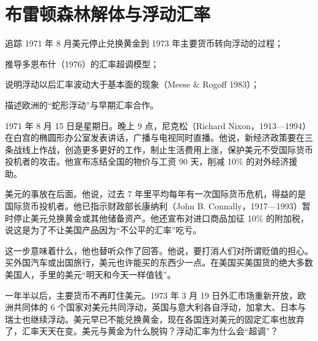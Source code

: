 \chapter{布雷顿森林解体与浮动汇率}\label{ch:floating}

\begin{chapterguide}
\begin{guidegoals}
\item 追踪 1971 年 8 月美元停止兑换黄金到 1973 年主要货币转向浮动的过程；
\item 推导多恩布什（1976）的汇率超调模型；
\item 说明浮动以后汇率波动大于基本面的现象（Meese \& Rogoff 1983）；
\item 描述欧洲的“蛇形浮动”与早期汇率合作。
\end{guidegoals}
\end{chapterguide}

1971 年 8 月 15 日是星期日。晚上 9 点，尼克松（Richard Nixon，1913—1994）在白宫的椭圆形办公室发表讲话，广播与电视同时直播\cite{nixon1971,loc46}。他说，新经济政策要在三条战线上作战，创造更多更好的工作，制止生活费用上涨，保护美元不受国际货币投机者的攻击\cite{nixon1971}。他宣布冻结全国的物价与工资 90 天，削减 10\% 的对外经济援助\cite{nixon1971}。

美元的事放在后面。他说，过去 7 年里平均每年有一次国际货币危机，得益的是国际货币投机者\cite{nixon1971}。他已指示财政部长康纳利（John B. Connally，1917—1993）暂时停止美元兑换黄金或其他储备资产\cite{nixon1971,loc46}。他还宣布对进口商品加征 10\% 的附加税，说这是为了不让美国产品因为“不公平的汇率”吃亏\cite{nixon1971}。

这一步意味着什么，他也替听众作了回答。他说，要打消人们对所谓贬值的担心\cite{nixon1971}。买外国汽车或出国旅行，美元也许能买的东西少一点\cite{nixon1971}。在美国买美国货的绝大多数美国人，手里的美元“明天和今天一样值钱”\cite{nixon1971}。

一年半以后，主要货币不再盯住美元。1973 年 3 月 19 日外汇市场重新开放，欧洲共同体的 6 个国家对美元共同浮动，英国与意大利各自浮动，加拿大、日本与瑞士也继续浮动\cite{bis1973}。美元早已不能兑换黄金，现在各国连对美元的固定汇率也放弃了，汇率天天在变。美元与黄金为什么脱钩？浮动汇率为什么会“超调”？

